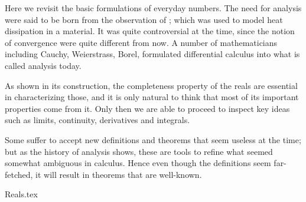  \label{chap:PMA}

Here we revisit the basic formulations of everyday numbers.
The need for analysis were said to be born
from the observation of ;
which was used to model heat dissipation in a material.
It was quite controversial at the time,
since the notion of convergence were quite different from now.
A number of mathematicians including
Cauchy,
Weierstrass,
Borel,
formulated differential calculus into what is called analysis today.

As shown in its construction,
the completeness property of the reals are essential
in characterizing those,
and it is only natural to think that
most of its important properties come from it.
Only then we are able to proceed to inspect key ideas such as
limits,
continuity,
derivatives and integrals.

Some suffer to accept new definitions and theorems
that seem useless at the time;
but as the history of analysis shows,
these are tools to refine what seemed somewhat ambiguous in calculus.
Hence even though the definitions seem far-fetched,
it will result in theorems that are well-known.

{Reals.tex}